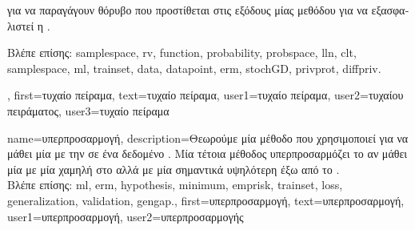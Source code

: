 {{\begin{itemize}
{			για να παραγάγουν θόρυβο που προστίθεται στις εξόδους μίας μεθόδου}  \foreignlanguage{greek}{για να 
			εξασφαλιστεί η} . 
	 	\end{itemize} 
		\foreignlanguage{greek}{Βλέπε επίσης:} \gls{samplespace}, \gls{rv}, \gls{function}, \gls{probability}, \gls{probspace}, \gls{lln}, \gls{clt}, \gls{samplespace}, 
		\gls{ml}, \gls{trainset}, \gls{data}, \gls{datapoint}, \gls{erm}, \gls{stochGD}, \gls{privprot}, \gls{diffpriv}. },
 	first={\foreignlanguage{greek}{τυχαίο πείραμα}},
 	text={\foreignlanguage{greek}{τυχαίο πείραμα}},
	user1={\foreignlanguage{greek}{τυχαίο πείραμα}}, %
	user2={\foreignlanguage{greek}{τυχαίου πειράματος}}, %
	user3={\foreignlanguage{greek}{τυχαίο πεί\-ραμα}} %
}

{name={\foreignlanguage{greek}{υπερπροσαρμογή}},
	description={\foreignlanguage{greek}{Θεωρούμε μία μέθοδο}  
		 \foreignlanguage{greek}{που χρησιμοποιεί}  \foreignlanguage{greek}{για να μάθει μία}  
		\foreignlanguage{greek}{με την}   \foreignlanguage{greek}{σε ένα δεδομένο}  
		. \foreignlanguage{greek}{Μία τέτοια μέθοδος υπερπροσαρμόζει το}  \foreignlanguage{greek}{αν 
		μάθει μία}  \foreignlanguage{greek}{με μία χαμηλή}  \foreignlanguage{greek}{στο} 
		 \foreignlanguage{greek}{αλλά με μία σημαντικά υψηλότερη}  \foreignlanguage{greek}{έξω 
		από το} .\\
		\foreignlanguage{greek}{Βλέπε επίσης:} \gls{ml}, \gls{erm}, \gls{hypothesis}, \gls{minimum}, \gls{emprisk}, \gls{trainset}, \gls{loss}, 
		\gls{generalization}, \gls{validation}, \gls{gengap}.},
	first={\foreignlanguage{greek}{υπερπροσαρμογή}},
	text={\foreignlanguage{greek}{υπερπροσαρμογή}},
	user1={\foreignlanguage{greek}{υπερπροσαρμογή}}, %
    	user2={\foreignlanguage{greek}{υπερπροσαρμογής}} %
}

